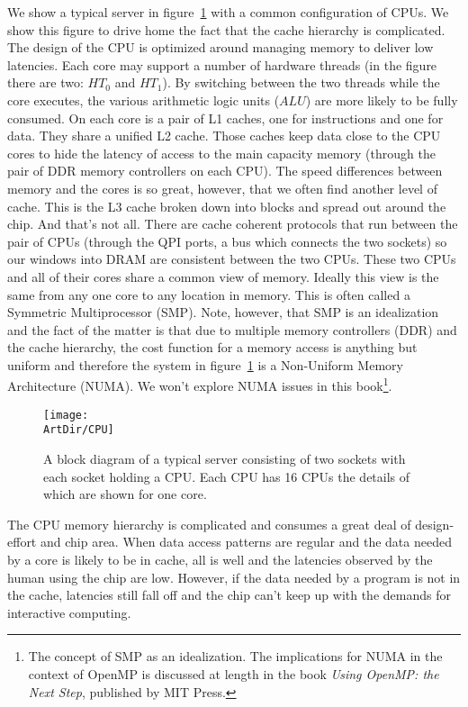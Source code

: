 We show a typical server in figure~\ref{figure:CPU} with a common configuration of CPUs.   
We show this figure to drive home the fact that the cache hierarchy is complicated.  The design
of the CPU is optimized around managing memory to deliver low latencies.   Each core may
support a number of hardware threads (in the figure there are two: $HT_0$ and $HT_1$).  By switching between the two threads
while the core executes, the various arithmetic logic units ($ALU$) are more likely to be fully consumed.
On each core is a pair of L1 caches, one for instructions and one for
data.  They share a unified L2 cache.   Those caches keep data close to the CPU cores to hide the latency
of access to the main capacity memory (through the pair of DDR memory controllers on each CPU).  The speed differences
between memory and the cores is so great, however, that we often find another level of cache.  This is the L3 
cache broken down into blocks and spread out around the chip.   And that's not all.  There are cache coherent 
protocols that run between the pair of CPUs (through the QPI ports, a bus which connects the two sockets) so our windows into DRAM are
consistent between the two CPUs.  These two CPUs and all of their cores share a common view of memory. 
Ideally this view is the same from any one core to any location in memory. This is often 
called a Symmetric Multiprocessor (SMP).   Note, however, that SMP is an idealization and the fact of the matter
is that due to multiple memory controllers (DDR) and the cache hierarchy, the cost function for a memory access is
anything but uniform and therefore the system in figure~\ref{figure:CPU} is a Non-Uniform Memory Architecture (NUMA).
We won't explore NUMA issues in this book\footnote{The concept of SMP as an idealization. The implications
for NUMA in the context of OpenMP is discussed at length in the book \emph{Using OpenMP: the Next Step}, published by MIT Press.}.

\begin{figure}[t]
\centerline{\texttt{[image: \\ArtDir/CPU]}}
\caption{A block diagram of a typical server consisting of two sockets with each socket holding a CPU. Each
CPU has 16 CPUs the details of which are shown for one core.}
\label{figure:CPU}
\end{figure}

The CPU memory hierarchy is complicated and consumes a great deal of design-effort and chip area.  
When data access patterns are regular and the data needed by a core is likely to be in cache, all is well and 
the latencies observed by the human using the chip are low.  However, if the data needed by a program is
not in the cache, latencies still fall off and the chip can't keep up with the demands for interactive computing.

